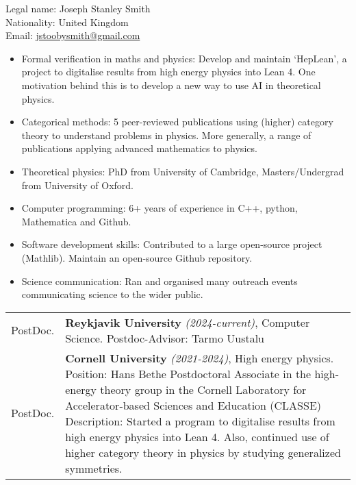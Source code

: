 \documentclass[14pt,letter]{article}
\newcommand{\mybullet}{\textcolor{mycolor}{$\ast$}\ }
\newcounter{customtitle}
\begin{document}
\vspace{-2cm}
\begin{flushright}
{{\color{white}Legal name: Joseph Stanley Smith  \\
{\color{white}Nationality:} United Kingdom$\;\;\;\;\;\;\;\,\,$\\
{\color{white}Email:} \href{mailto:jstoobysmith@gmail.com}{jstoobysmith@gmail.com}$\;\;\;\;$}}
\end{flushright}
\vspace{1cm}
	
\noindent 

\vspace{0.3cm}
\begin{itemize}[label=\mybullet]
	\item Formal verification in maths and physics: Develop and maintain `HepLean', a project to digitalise results from high energy physics into Lean 4. One motivation behind this is to develop a new way to use AI in theoretical physics.
	\item Categorical methods: 5 peer-reviewed publications using (higher) category theory to understand problems in physics. More generally, a range of publications applying advanced mathematics to physics.
	\item Theoretical physics: PhD from University of Cambridge, Masters/Undergrad from University of Oxford. 
 	\item Computer programming: 6+ years of experience in C++, python, Mathematica and Github.
 	\item Software development skills: Contributed to a large open-source project (Mathlib). Maintain an open-source Github repository. 
 	\item Science communication: Ran and organised many outreach events communicating science to the wider public. 
\end{itemize}


\noindent\begin{tabular}{p{}p{}}
	PostDoc. & \textbf{Reykjavik University} \emph{(2024-current)}, Computer Science. \newline 
	{\color{mycolor} Postdoc-Advisor:} Tarmo Uustalu\\
	PostDoc. &  \textbf{Cornell University} \emph{(2021-2024)}, High energy physics.
	\newline 
	{\color{mycolor} Position:}  Hans Bethe Postdoctoral Associate in the high-energy theory group in the Cornell Laboratory for Accelerator-based Sciences and Education (CLASSE)
	\newline 
	{\color{mycolor} Description:}  Started a program to digitalise results from high energy physics into Lean 4. Also, continued use of higher category theory in physics by studying generalized symmetries.\end{tabular}
\end{document}
